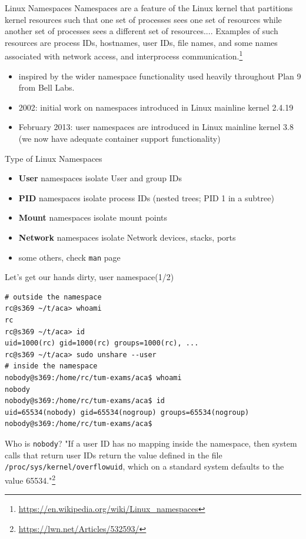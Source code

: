 \documentclass[
  english,          
  aspectratio=169,    %
]{tumbeamer}
\begin{document}
\begin{frame}{Linux Namespaces}
Namespaces are a feature of the Linux kernel that partitions kernel resources such that one set of processes sees one set of resources while another set of processes sees a different set of resources.... Examples of such resources are process IDs, hostnames, user IDs, file names, and some names associated with network access, and interprocess communication.\footnote{\href{https://en.wikipedia.org/wiki/Linux_namespaces}{https://en.wikipedia.org/wiki/Linux\_namespaces}}
\vspace{8mm}
\begin{itemize}
    \item inspired by the wider namespace functionality used heavily throughout Plan 9 from Bell Labs.
    \item 2002: initial work on namespaces introduced in Linux mainline kernel 2.4.19 
    \item February 2013: user namespaces are introduced in Linux mainline kernel 3.8 (we now have adequate container support functionality)
\end{itemize}
\end{frame}

\begin{frame}{Type of Linux Namespaces}
\begin{itemize}
    \item \textbf{User} namespaces isolate User and group IDs
    \item \textbf{PID} namespaces isolate process IDs (nested trees; PID 1 in a subtree)
    \item \textbf{Mount} namespaces isolate mount points
    \item \textbf{Network} namespaces isolate Network devices, stacks, ports
    \item some others, check \texttt{man} page
\end{itemize}
\end{frame}

\begin{frame}[fragile]{Let's get our hands dirty, user namespace(1/2)}
\begin{verbatim}
# outside the namespace
rc@s369 ~/t/aca> whoami
rc
rc@s369 ~/t/aca> id
uid=1000(rc) gid=1000(rc) groups=1000(rc), ...
rc@s369 ~/t/aca> sudo unshare --user
# inside the namespace
nobody@s369:/home/rc/tum-exams/aca$ whoami
nobody
nobody@s369:/home/rc/tum-exams/aca$ id
uid=65534(nobody) gid=65534(nogroup) groups=65534(nogroup)
nobody@s369:/home/rc/tum-exams/aca$ 

\end{verbatim}

Who is \texttt{nobody}? 
\small "If a user ID has no mapping inside the namespace, then system calls that return user IDs return the value defined in the file \texttt{/proc/sys/kernel/overflowuid}, which on a standard system defaults to the value 65534."\footnote{\href{https://lwn.net/Articles/532593/}{https://lwn.net/Articles/532593/}}

\end{frame}
\end{document}
